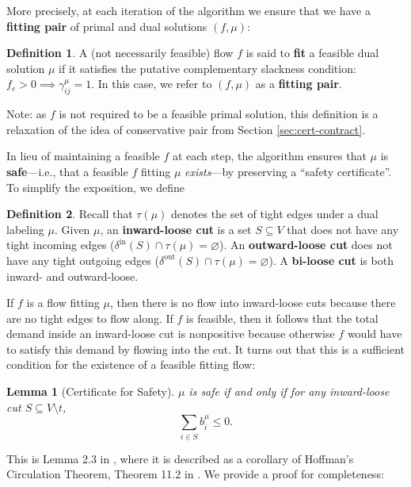 \documentclass[11pt]{article}
\newtheorem{lemma}[theorem]{Lemma}
\theoremstyle{definition}
\newtheorem{definition}{Definition}[section]
\theoremstyle{definition}
\theoremstyle{definition}
\newcommand{\biu}{b_{i}^{\mu}}
\newcommand{\giij}{\gamma_{ij}^{\mu}}
\newcommand{\vnott}{V \setminus t}
\newcommand{\din}{\delta^{\text{in}}}
\newcommand{\dout}{\delta^{\text{out}}}
\begin{document}
	More precisely, at each iteration of the algorithm we ensure that we have a
	\textbf{fitting pair}
	of primal and dual solutions $(f,\mu)$:
	\begin{definition}
	A (not necessarily feasible) flow $f$ is said to \textbf{fit} a feasible dual solution $\mu$
    if it satisfies the putative complementary slackness condition: $f_e > 0 \implies \giij = 1$.
    In this case, we refer to $(f, \mu)$ as a \textbf{fitting pair}.
	\end{definition}
    Note: as $f$ is not required to be a feasible primal solution,
    this definition is a relaxation of the idea of
	conservative pair from Section \ref{sec:cert-contract}.
    
	In lieu of maintaining a feasible $f$ at each step,
	the algorithm ensures that $\mu$ is \textbf{safe}---i.e.,
    that a feasible $f$ fitting $\mu$ \emph{exists}---by preserving a
	``safety certificate''. To simplify the exposition, we define 
	\begin{definition}
		Recall that $\tau(\mu)$ denotes the set of tight edges under a dual labeling $\mu$.
		Given $\mu$, an \textbf{inward-loose cut} is a set $S \subseteq V$ that does
		not have any tight incoming edges 
		($\din(S) \cap \tau(\mu) = \varnothing$). An \textbf{outward-loose cut}
		does not have any tight outgoing edges ($\dout(S) \cap \tau(\mu) = \varnothing$). A \textbf{bi-loose cut}
		is both inward- and outward-loose.
	\end{definition}
	If $f$ is a flow fitting $\mu$, then there is no flow into inward-loose cuts because
	there are no tight edges to flow along.
	If $f$ is feasible, then it follows that the total demand inside an inward-loose
	cut is nonpositive because otherwise $f$ would have to satisfy this demand by flowing
	into the cut.
	It turns out that this is a sufficient condition for the existence
	of a feasible fitting flow:
	\begin{lemma}[Certificate for Safety] \label{lem.safety}
	$\mu$ is safe if and only if for any inward-loose cut $S \subseteq \vnott$,
	\[ \sum_{i \in S} \biu \leq 0. \]
	\end{lemma}
	This is Lemma 2.3 in \cite{Olver2017}, where it is described as a corollary of Hoffman's Circulation
	Theorem, Theorem 11.2 in \cite{Schrijver2002}. We provide a proof for completeness:
\end{document}
